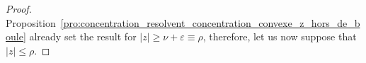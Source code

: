 \documentclass{ws-rmta}
\DeclareMathOperator{\tr}{Tr}
\begin{document}
\begin{proof}
  Proposition~\ref{pro:concentration_resolvent_concentration_convexe_z_hors_de_boule} already set the result for $|z| \geq \nu + \varepsilon\equiv \rho $, therefore, let us now suppose that $|z| \leq \rho$. 


\end{proof}
\end{document}
